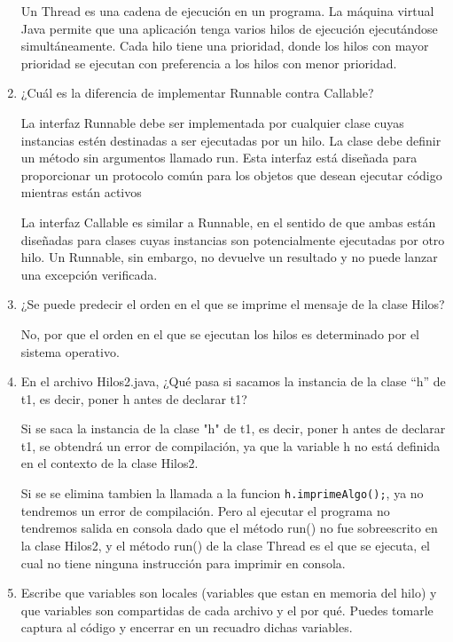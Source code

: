 \documentclass{article}
\begin{document}
\begin{enumerate}
    Un Thread es una cadena de ejecución en un programa. La máquina virtual Java permite que una aplicación tenga varios hilos de ejecución ejecutándose simultáneamente. Cada hilo tiene una prioridad, donde los hilos con mayor prioridad se ejecutan con preferencia a los hilos con menor prioridad. 
    
    \item ¿Cuál es la diferencia de implementar Runnable contra Callable?
    
    La interfaz Runnable debe ser implementada por cualquier clase cuyas instancias estén destinadas a ser ejecutadas por un hilo. La clase debe definir un método sin argumentos llamado run. Esta interfaz está diseñada para proporcionar un protocolo común para los objetos que desean ejecutar código mientras están activos

    La interfaz Callable es similar a Runnable, en el sentido de que ambas están diseñadas para clases cuyas instancias son potencialmente ejecutadas por otro hilo. Un Runnable, sin embargo, no devuelve un resultado y no puede lanzar una excepción verificada.

    \item ¿Se puede predecir el orden en el que se imprime el mensaje de la clase Hilos?
    
    No, por que el orden en el que se ejecutan los hilos es determinado por el sistema operativo.
    
    \item En el archivo Hilos2.java, ¿Qué pasa si sacamos la instancia de la clase “h” de t1, es decir, poner h antes de declarar t1?
    
    Si se saca la instancia de la clase "h" de t1, es decir, poner h antes de declarar t1, se obtendrá un error de compilación, ya que la variable h no está definida en el contexto de la clase Hilos2.
    
    Si se se elimina tambien la llamada a la funcion \texttt{h.imprimeAlgo();}, ya no tendremos un error de compilación. 
    Pero al ejecutar el programa no tendremos salida en consola dado que el método run() no fue sobreescrito en la clase Hilos2, y el método run() de la clase Thread es el que se ejecuta, el cual no tiene ninguna instrucción para imprimir en consola.

    \item Escribe que variables son locales (variables que estan en memoria del hilo) y que variables son compartidas de cada archivo y el por qué. Puedes tomarle captura al código y encerrar en un recuadro dichas variables.      
    

\end{enumerate}
\end{document}
